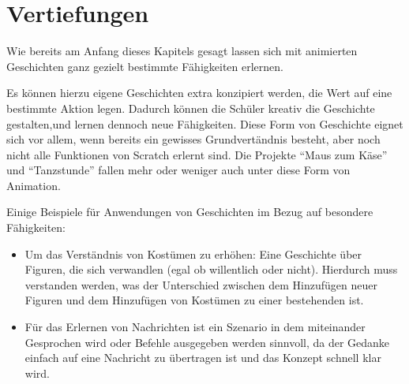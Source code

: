\section{Vertiefungen}\label{vertiefungen}

Wie bereits am Anfang dieses Kapitels gesagt lassen sich mit animierten
Geschichten ganz gezielt bestimmte Fähigkeiten erlernen.

Es können hierzu eigene Geschichten extra konzipiert werden, die Wert
auf eine bestimmte Aktion legen. Dadurch können die Schüler kreativ die
Geschichte gestalten,und lernen dennoch neue Fähigkeiten. Diese Form von
Geschichte eignet sich vor allem, wenn bereits ein gewisses
Grundvertändnis besteht, aber noch nicht alle Funktionen von Scratch
erlernt sind. Die Projekte ``Maus zum Käse'' und ``Tanzstunde'' fallen
mehr oder weniger auch unter diese Form von Animation.

Einige Beispiele für Anwendungen von Geschichten im Bezug auf besondere
Fähigkeiten:

\begin{itemize}
\item
  Um das Verständnis von Kostümen zu erhöhen: Eine Geschichte über
  Figuren, die sich verwandlen (egal ob willentlich oder nicht).
  Hierdurch muss verstanden werden, was der Unterschied zwischen dem
  Hinzufügen neuer Figuren und dem Hinzufügen von Kostümen zu einer
  bestehenden ist.
\item
  Für das Erlernen von Nachrichten ist ein Szenario in dem miteinander
  Gesprochen wird oder Befehle ausgegeben werden sinnvoll, da der
  Gedanke einfach auf eine Nachricht zu übertragen ist und das Konzept
  schnell klar wird.
\end{itemize}
